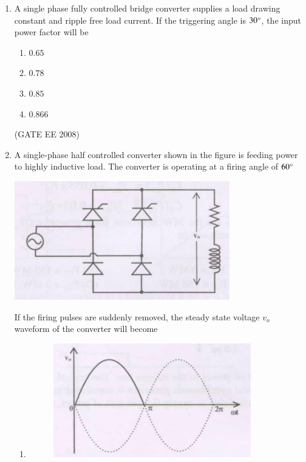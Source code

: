 \documentclass[journal,12pt,onecolumn]{IEEEtran}
\theoremstyle{remark}
\begin{document}
\begin{enumerate}[start=1, label=Q.\arabic*]
\item A single phase fully controlled bridge converter supplies a load drawing constant and ripple free load current. If the triggering angle is $30\degree$, the input power factor will be

\begin{multicols}{4}
\begin{enumerate}[label=(\Alph*)]
    \item $0.65$
    \item $0.78$
    \item $0.85$
    \item $0.866$
\end{enumerate}
\end{multicols}
\hfill (GATE EE 2008)


\item A single-phase half controlled converter shown in the figure is feeding power to highly inductive
load. The converter is operating at a firing angle of $60\degree$
\begin{center}
    \includegraphics[width=\columnwidth]{Fig/q56.png}
\end{center}
If the firing pulses are suddenly removed, the steady state voltage $v_o$ waveform of the converter
will become
\begin{enumerate}[label=(\Alph*)]
        
    \item 
    \begin{figure}[H]
        \includegraphics[width=0.5\columnwidth]{Fig/q56-A.png}
    \end{figure}



\end{enumerate}
\end{enumerate}
\end{document}
